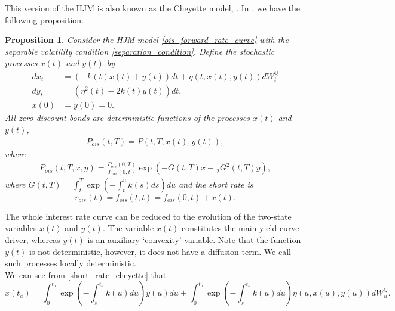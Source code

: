 \documentclass[a4paper,10pt]{article}
\newtheorem{proposition}[theorem]{Proposition}
\newcommand{\1}{\mathbf{1}}
\begin{document}
This version of the HJM is also known as the Cheyette model, \cite{Cheyette}. In \cite{AndreasenPiterbarg}, we have the following proposition.
\begin{proposition}
Consider the HJM model \eqref{ois_forward_rate_curve} with the separable volatility condition \eqref{separation_condition}. Define the stochastic processes $x(t)$ and $y(t)$ by
\begin{align}\label{short_rate_cheyette}
dx_t &= \left(-k(t) x(t) + y(t)\right)dt + \eta\left(t,x(t),y(t)\right) dW_t^{\mathbb{Q}} \nonumber \\
dy_t &= \left(\eta^{2}(t) - 2 k(t) y(t)\right) dt ,\nonumber \\
x(0) &=y(0)=0.
\end{align}
All zero-discount bonds are deterministic functions of the processes $x(t)$ and $y(t)$,
\begin{eqnarray*}
P_{ois}(t,T)=P(t, T, x(t), y(t)), 
\end{eqnarray*}
where 
\begin{eqnarray}\label{bond_ois}
P_{ois}(t,T,x,y) = \frac{P_{ois}(0,T)}{P_{ois}(0,t)} \exp\left(-G(t,T)x - \frac{1}{2} G^{2}(t,T)y \right),
\end{eqnarray}
where $G(t,T) = \int_{t}^{T} \exp\left(-\int_{t}^{u} k(s) ds \right) du$ and the short rate is
\begin{equation}
r_{ois}(t)=f_{ois}(t,t)= f_{ois}(0,t) + x(t).
\end{equation} 
\end{proposition}

The whole interest rate curve can be reduced to the evolution of the two-state variables $x(t)$ and $y(t)$. The variable $x(t)$ constitutes the main yield curve driver, whereas $y(t)$ is an auxiliary `convexity' variable. Note that the function $y(t)$ is not deterministic, however, it does not have a diffusion term. We call such processes locally deterministic. \\

We can see from \eqref{short_rate_cheyette} that
\begin{equation*}
x(t_a) = \int_{0}^{t_a} \exp\left(-\int_{s}^{t_a}k(u) du\right) y(u) du + \int_{0}^{t_a}  \exp\left(-\int_{s}^{t_a}k(u) du \right) \eta(u,x(u),y(u)) dW_u^{\mathbb{Q}}. 
\end{equation*}
\end{document}
